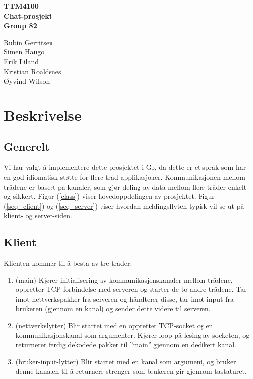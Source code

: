 \documentclass[12pt,a4paper,norsk]{article}
\begin{document}
\begin{titlepage}
    \centering
    \vfill
    {\bf\Large
        TTM4100 \\
        Chat-prosjekt \\
        \vskip2cm
        Group 82
    }

   {\large
   Rubin Gerritsen\\
   Simen Haugo\\
   Erik Liland\\
   Kristian Roaldsnes\\
   Øyvind Wilson
   }
   \vfill
   \vfill
   \tableofcontents
   \vfill
\end{titlepage}

\section{Beskrivelse}
\subsection{Generelt}
Vi har valgt å implementere dette prosjektet i Go, da dette er et språk som har en god idiomatisk støtte for flere-tråd applikasjoner. Kommunikasjonen mellom trådene er basert på kanaler, som gjør deling av data mellom flere tråder enkelt og sikkert. Figur (\ref{class}) viser hovedoppdelingen av prosjektet. Figur (\ref{seq_client}) og (\ref{seq_server}) viser hvordan meldingsflyten typisk vil se ut på klient- og server-siden.

\subsection{Klient}
Klienten kommer til å bestå av tre tråder:
\begin{enumerate}
	\item (main) Kjører initialisering av kommunikasjonskanaler mellom trådene, oppretter TCP-forbindelse med serveren og starter de to andre trådene. Tar imot nettverkspakker fra serveren og håndterer disse, tar imot input fra brukeren (gjennom en kanal) og sender dette videre til serveren.
	\item (nettverkslytter) Blir startet med en opprettet TCP-socket og en kommunikasjonskanal som argumenter. Kjører loop på lesing av socketen, og returnerer ferdig dekodede pakker til ”main” gjennom en dedikert kanal.
	\item (bruker-input-lytter) Blir startet med en kanal som argument, og bruker denne kanalen til å returnere strenger som brukeren gir gjennom tastaturet.
\end{enumerate}
\end{document}
